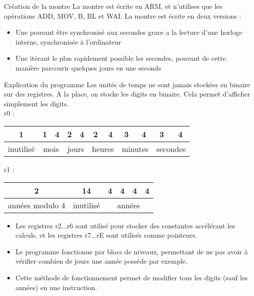 \documentclass[11pt]{beamer}
\begin{document}
\begin{frame}{Création de la montre}
  La montre est écrite en ARM, et n'utilises que les opérations ADD, MOV, B, BL
  et WAI. La montre est écrite en deux versions :
  \begin{itemize}
  \item{Une pouvant être synchronisé aux secondes grace a la lecture d'une
      horloge interne, synchronisée à l'ordinateur}
  \item{Une itérant le plus rapidement possible les secondes, pouvant de cette
      manière parcourir quelques jours en une seconde}
  \end{itemize}
\end{frame}

\begin{frame}{Explication du programme}
  Les unités de temps ne sont jamais stockées en binaire sur des registres. A la
  place, on stocke les digits en binaire. Cela permet d'afficher simplement les
  digits.\\

  r0 : 
  \begin{tabular}{|c|c|c|c|c|c|c|c|c|c|c|}
    \hline
    1 & 1 & 4 & 2 & 4 & 2 & 4 & 3 & 4 & 3 & 4\\
    \hline
    inutilisé & \multicolumn{2}{c|}{mois} & \multicolumn{2}{c|}{jours} & \multicolumn{2}{c|}{heures} & \multicolumn{2}{c|}{minutes} & \multicolumn{2}{c|}{secondes} \\
    \hline
  \end{tabular}

  r1 :
  \begin{tabular}{|c|c|c|c|c|c|}
    \hline
    2 & 14 & 4 & 4 & 4 & 4\\
    \hline
    années modulo 4 & inutilisé & \multicolumn{4}{c|}{années} \\
    \hline
  \end{tabular}
 
  \begin{itemize}
  \item Les registres r2...r6 sont utilisé pour stocker des constantes accélérant les
  calculs, et les registres r7...rE sont utilisés comme pointeurs.\\

  
  \item Le programme fonctionne par blocs de niveaux, permettant de ne pas avoir à
  vérifier combien de jours une année possède par exemple.\\

  
  \item Cette méthode de fonctionnement permet de modifier tous les digits (sauf les
  années) en une instruction.
  \end{itemize}
\end{frame}
\end{document}
